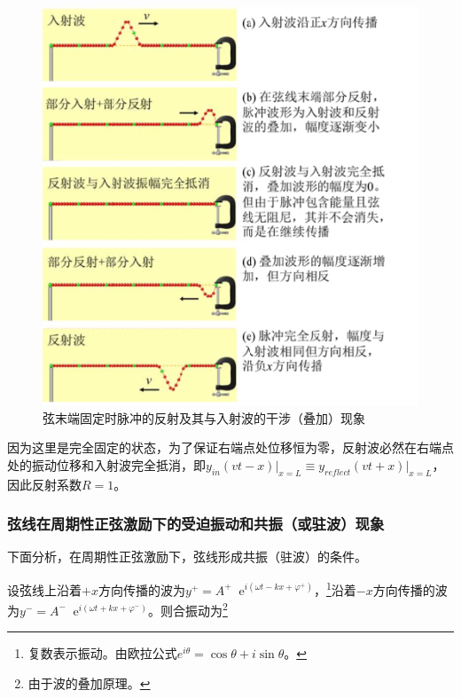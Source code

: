 \documentclass[a4paper,11pt]{article}
\newcommand*{\e}{\mathop{}\!\mathrm{e}}
\begin{document}
            \begin{figure}[ht]
                \centering
                \includegraphics[scale=0.7]{反射.png}
                \caption{弦末端固定时脉冲的反射及其与入射波的干涉（叠加）现象}
                \label{反射}
            \end{figure}
            
            因为这里是完全固定的状态，为了保证右端点处位移恒为零，反射波必然在右端点处的振动位移和入射波完全抵消，即$y_{in}(vt-x)\big|_{x=L} \equiv y_{reflect}(vt+x)\big|_{x=L}$，因此反射系数$R = 1$。
            
        \subsubsection{弦线在周期性正弦激励下的受迫振动和共振（或驻波）现象}

            下面分析，在周期性正弦激励下，弦线形成共振（驻波）的条件。

            设弦线上沿着$+x$方向传播的波为$y^+ = A^+ \e^{i(\omega t-kx+\varphi^+)}$，\footnote{复数表示振动。由欧拉公式$e^{i\theta} = \cos\theta + i\sin\theta$。}沿着$-x$方向传播的波为$y^- = A^- \e^{i(\omega t+kx+\varphi^-)}$。则合振动为\footnote{由于波的叠加原理。}
\end{document}
